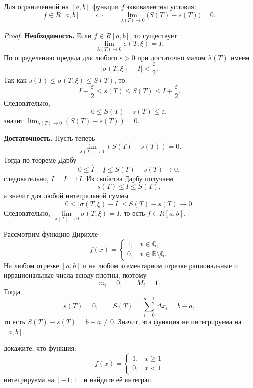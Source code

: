 \begin{theorem}
Для ограниченной на $[a,b]$ функции $f$ эквивалентны условия:
\[
 f\in R[a,b]\qquad\Longleftrightarrow\qquad \lim_{\lambda(T)\to 0}\bigl(S(T)-s(T)\bigr)=0.
\]


\begin{proof}
\textbf{Необходимость.}
Если $f\in R[a,b]$, то существует
\[
\lim_{\lambda(T)\to 0}\sigma(T,\xi)=I.
\]
По определению предела для любого $\varepsilon>0$ при достаточно малом $\lambda(T)$ имеем
\[
|\sigma(T,\xi)-I|<\frac{\varepsilon}{2}.
\]
Так как $s(T)\leqslant \sigma(T,\xi)\leqslant S(T)$, то
\[
I-\frac{\varepsilon}{2}\leqslant s(T)\leqslant S(T)\leqslant I+\frac{\varepsilon}{2}.
\]
Следовательно,
\[
0\leqslant S(T)-s(T)\leqslant \varepsilon,
\]
значит $\lim_{\lambda(T)\to 0}(S(T)-s(T))=0$.

\medskip
\textbf{Достаточность.}
Пусть теперь
\[
\lim_{\lambda(T)\to 0}(S(T)-s(T))=0.
\]
Тогда по теореме Дарбу
\[
0\leqslant \overline I-\underline I\leqslant S(T)-s(T)\to 0,
\]
следовательно, $\underline I=\overline I=:I$.
Из свойства Дарбу получаем
\[
s(T)\leqslant I\leqslant S(T),
\]
а значит для любой интегральной суммы
\[
0\leqslant |\sigma(T,\xi)-I|\leqslant S(T)-s(T)\to 0.
\]
Следовательно, $\lim\limits_{\lambda(T)\to 0}\sigma(T,\xi)=I$, то есть $f\in R[a,b]$.
\end{proof}

\end{theorem}

\begin{example}
Рассмотрим функцию Дирихле
\[
 f(x)=\begin{cases}
 1, & x\in\mathbb{Q},\\
 0, & x\in\mathbb{R}\setminus\mathbb{Q}.
 \end{cases}
\]
На любом отрезке $[a,b]$ и на любом элементарном отрезке рациональные и иррациональные числа всюду плотны, поэтому
\[
 m_i=0,\qquad M_i=1.
\]
Тогда
\[
 s(T)=0,\qquad S(T)=\sum\limits_{i=0}^{n-1}\Delta x_i=b-a,
\]
то есть $S(T)-s(T)=b-a\neq 0$.
Значит, эта функция не интегрируема на $[a,b]$.
\end{example}

\begin{task}
докажите, что функция: \\
\[
 f(x)=\begin{cases}
 1, & x \geqslant 1\\
 0, & x < 1
 \end{cases}
\]
интегрируема на $[-1;1]$ и найдите её интеграл.

\end{task}

